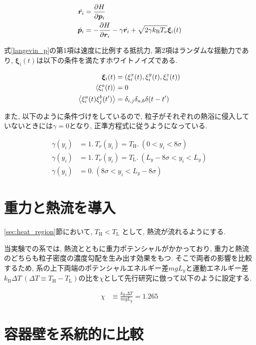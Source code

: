 \begin{align}
  \label{langevin_r}
  \dot{\bm{r}_i} &= \pdv{H}{\bm{p}_i} \\
  \label{langevin_p}
  \dot{\bm{p}_i} &= - \pdv{H}{\bm{r}_i} - \gamma \dot{\bm{r}_i} + \sqrt{2 \gamma k_{\text{B}}T_{\nu}}\bm{\xi}_i (t) 
\end{align}

式\eqref{langevin_p}の第1項は速度に比例する抵抗力, 第2項はランダムな揺動力であり, $\bm{\xi}_{i}(t)$は以下の条件を満たすホワイトノイズである.

\begin{align}
  \bm{\xi}_{i}(t) &= ({\xi_{i}^{x}(t)}, {\xi_{i}^{y}(t)}, {\xi_{i}^{z}(t)}) \\
  \expval{\xi_{i}^{a}(t)} &= 0 \\
  \expval{\xi_{i}^{a}(t)\xi_{j}^{b}(t')} &= \delta_{i,j} \delta_{a,b}\delta (t-t')
\end{align}

また, 以下のように条件づけをしているので, 粒子がそれぞれの熱浴に侵入していないときには$\gamma=0$となり, 正準方程式に従うようになっている. 

\begin{align}
  \gamma(y_i) &= 1. \ T_{\nu}(y_i) = T_{\text{H}}. \ (0 < y_i < 8\sigma) \\
  \gamma(y_i) &= 1. \ T_{\nu}(y_i) = T_{\text{L}}. \ (L_y - 8\sigma < y_i < L_y) \\
  \gamma(y_i) &= 0.  \ (8\sigma < y_i < L_y - 8\sigma)
\end{align}

\section{重力と熱流を導入}

\ref{sec:heat_region}節において, $T_{\text{H}} < T_{\text{L}}$ として, 熱流が流れるようにする. 

当実験での系では, 熱流とともに重力ポテンシャルがかかっており, 重力と熱流のどちらも粒子密度の濃度勾配を生み出す効果をもつ. そこで両者の影響を比較するため, 系の上下両端のポテンシャルエネルギー差$mgL_y$と運動エネルギー差$k_{\text{B}}\Delta T \ (\Delta T \equiv T_{\text{H}} - T_{\text{L}})$の比を$\chi$として先行研究に倣って以下のように設定する. \cite{Yoshida}

\begin{align}
  \chi &\equiv \frac{k_{\text{B}}\Delta T}{mgL_{y}} = 1.265
\end{align}

\section{容器壁を系統的に比較}

